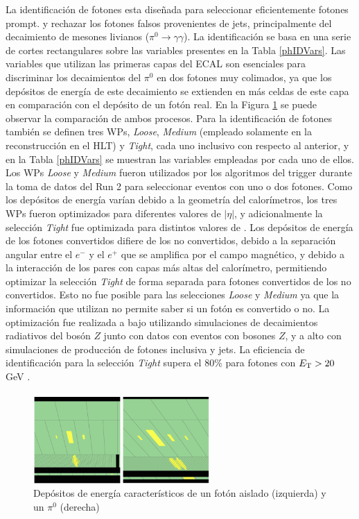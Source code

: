 La identificación de fotones esta diseñada para seleccionar eficientemente fotones prompt. y rechazar los fotones falsos provenientes de jets, principalmente del decaimiento de mesones livianos ($\pi^{0}\to\gamma\gamma$). La identificación se basa en una serie de cortes rectangulares sobre las variables presentes en la Tabla \ref{phIDVars}. Las variables que utilizan las primeras capas del ECAL son esenciales para discriminar los decaimientos del $\pi^{0}$ en dos fotones muy colimados, ya que los depósitos de energía de este decaimiento se extienden en más celdas de este capa en comparación con el depósito de un fotón real. En la Figura \ref{phpizero} se puede observar la comparación de ambos procesos. 
Para la identificación de fotones también se definen tres WPs, \textit{Loose}, \textit{Medium} (empleado solamente en la reconstrucción en el HLT) y \textit{Tight}, cada uno inclusivo con respecto al anterior, y en la Tabla \ref{phIDVars} se muestran las variables empleadas por cada uno de ellos. Los WPs \textit{Loose} y \textit{Medium} fueron utilizados por los algoritmos del trigger durante la toma de datos del Run 2 para seleccionar eventos con uno o dos fotones. Como los depósitos de energía varían debido a la geometría del calorímetros, los tres WPs fueron optimizados para diferentes valores de $|\eta|$, y adicionalmente la selección \textit{Tight} fue optimizada para distintos valores de \ET. Los depósitos de energía de los fotones convertidos difiere de los no convertidos, debido a la separación angular entre el $e^-$ y el $e^+$ que se amplifica por el campo magnético, y debido a la interacción de los pares con capas más altas del calorímetro, permitiendo optimizar la selección \textit{Tight} de forma separada para fotones convertidos de los no convertidos. Esto no fue posible para las selecciones \textit{Loose} y \textit{Medium} ya que la información que utilizan no permite saber si un fotón es convertido o no. La optimización fue realizada a bajo \ET utilizando simulaciones de decaimientos radiativos del bosón $Z$ junto con datos con eventos con bosones $Z$, y a alto \ET con simulaciones de producción de fotones inclusiva y jets. La eficiencia de identificación para la selección \textit{Tight} supera el 80\% para fotones con $E_{\text{T}}>20$ GeV \cite{EGAM-2018-01}.

\begin{figure}
\centering
  \includegraphics[width=0.6\textwidth]{images/PhotonPizero.png}
\caption{Depósitos de energía característicos de un fotón aislado (izquierda) y un $\pi^0$ (derecha) 
\commentNotaIII
}
  \label{phpizero}
\end{figure}


